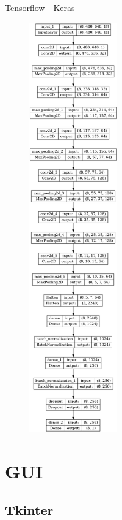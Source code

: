 \documentclass[aspectratio=169]{beamer}
\begin{document}
\begin{frame}{Tensorflow - Keras}
\begin{figure}
        \includegraphics[trim={0 0 0 51cm},clip,width=3.8cm]{model_plot.png} \hfill
    \end{figure}
\end{frame}

\section{GUI}

\subsection{Tkinter}
\end{document}

